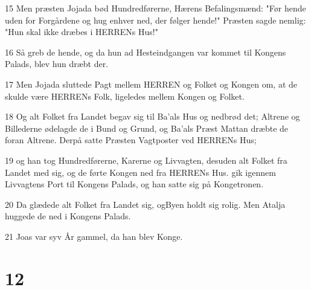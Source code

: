 \par 15 Men præsten Jojada bød Hundredførerne, Hærens Befalingsmænd: "Før hende uden for Forgårdene og hug enhver ned, der følger hende!" Præsten sagde nemlig: "Hun skal ikke dræbes i HERRENs Hus!"
\par 16 Så greb de hende, og da hun ad Hesteindgangen var kommet til Kongens Palads, blev hun dræbt der.
\par 17 Men Jojada sluttede Pagt mellem HERREN og Folket og Kongen om, at de skulde være HERRENs Folk, ligeledes mellem Kongen og Folket.
\par 18 Og alt Folket fra Landet begav sig til Ba'als Hus og nedbrød det; Altrene og Billederne ødelagde de i Bund og Grund, og Ba'als Præst Mattan dræbte de foran Altrene. Derpå satte Præsten Vagtposter ved HERRENs Hus;
\par 19 og han tog Hundredførerne, Karerne og Livvagten, desuden alt Folket fra Landet med sig, og de førte Kongen ned fra HERRENs Hus. gik igennem Livvagtens Port til Kongens Palads, og han satte sig på Kongetronen.
\par 20 Da glædede alt Folket fra Landet sig, ogByen holdt sig rolig. Men Atalja huggede de ned i Kongens Palads.
\par 21 Joas var syv År gammel, da han blev Konge.

\chapter{12}

